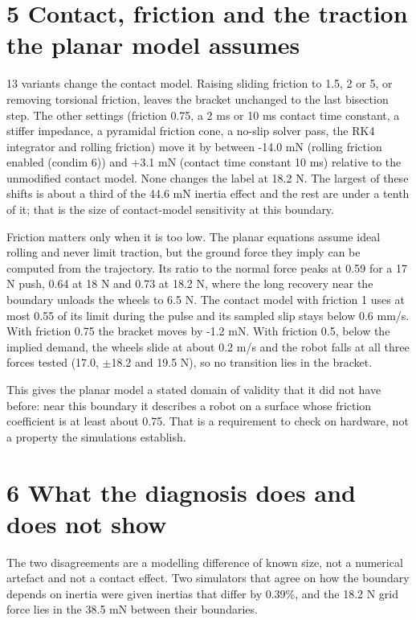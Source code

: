 \documentclass[11pt,a4paper]{article}
\begin{document}
\section*{5 Contact, friction and the traction the planar model assumes}
13 variants change the contact model. Raising sliding friction to 1.5, 2 or 5, or removing torsional friction, leaves the bracket unchanged to the last bisection step. The other settings (friction 0.75, a 2 ms or 10 ms contact time constant, a stiffer impedance, a pyramidal friction cone, a no-slip solver pass, the RK4 integrator and rolling friction) move it by between -14.0 mN (rolling friction enabled (condim 6)) and +3.1 mN (contact time constant 10 ms) relative to the unmodified contact model. None changes the label at 18.2 N. The largest of these shifts is about a third of the 44.6 mN inertia effect and the rest are under a tenth of it; that is the size of contact-model sensitivity at this boundary.

Friction matters only when it is too low. The planar equations assume ideal rolling and never limit traction, but the ground force they imply can be computed from the trajectory. Its ratio to the normal force peaks at 0.59 for a 17 N push, 0.64 at 18 N and 0.73 at 18.2 N, where the long recovery near the boundary unloads the wheels to 6.5 N. The contact model with friction 1 uses at most 0.55 of its limit during the pulse and its sampled slip stays below 0.6 mm/s. With friction 0.75 the bracket moves by -1.2 mN. With friction 0.5, below the implied demand, the wheels slide at about 0.2 m/s and the robot falls at all three forces tested (17.0, \ensuremath{\pm}18.2 and 19.5 N), so no transition lies in the bracket.

This gives the planar model a stated domain of validity that it did not have before: near this boundary it describes a robot on a surface whose friction coefficient is at least about 0.75. That is a requirement to check on hardware, not a property the simulations establish.

\clearpage
\section*{6 What the diagnosis does and does not show}
The two disagreements are a modelling difference of known size, not a numerical artefact and not a contact effect. Two simulators that agree on how the boundary depends on inertia were given inertias that differ by 0.39\%, and the 18.2 N grid force lies in the 38.5 mN between their boundaries.
\end{document}
